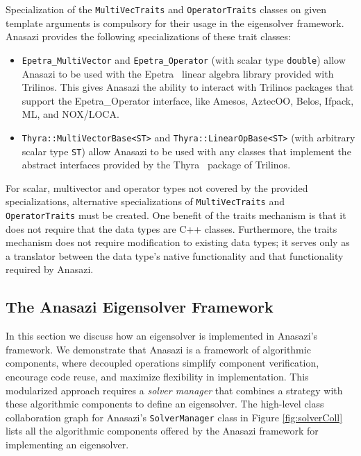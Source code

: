 \documentclass[acmtoms]{acmtrans2m}
\newcounter{algorithm}
\newcommand{\aspace}[1]{\texttt{#1}}
\begin{document}
Specialization of the \aspace{MultiVecTraits} and \aspace{OperatorTraits} classes on
given template arguments is compulsory for their usage in the eigensolver framework.
Anasazi provides the following specializations of these trait classes:
\begin{itemize}
  \item \aspace{Epetra\_MultiVector} and \aspace{Epetra\_Operator} (with scalar type
    \aspace{double}) allow Anasazi to be used with the Epetra~\cite{Trilinos:Epetra} linear
    algebra library provided with Trilinos. This gives Anasazi the ability to interact with 
    Trilinos packages that support the Epetra\_Operator interface, like Amesos, AztecOO, Belos, 
    Ifpack, ML, and NOX/LOCA. 
  \item \aspace{Thyra::MultiVectorBase<ST>} and
    \aspace{Thyra::LinearOpBase<ST>} (with arbitrary scalar type
    \aspace{ST}) allow Anasazi to be used with any classes that implement the abstract interfaces
    provided by the Thyra~\cite{Trilinos:Thyra} package of Trilinos.
\end{itemize}
For scalar, multivector and operator types not covered by the provided specializations,
alternative specializations of \aspace{MultiVecTraits} and \aspace{OperatorTraits}
must be created. One benefit of the traits mechanism is that it does
not require that the data types are C++ classes.  Furthermore, the traits mechanism
does not require modification to existing data types; it serves only as a translator between
the data type's native functionality and that functionality required by Anasazi.


\subsection{The Anasazi Eigensolver Framework}
\label{subsec:anasazi:solver_framework}

In this section we discuss how an eigensolver is implemented 
in Anasazi's framework.  We demonstrate that Anasazi is 
a framework of algorithmic components, where decoupled operations 
simplify component verification, encourage code reuse, and maximize flexibility
in implementation. This modularized approach requires a \emph{solver manager} that
combines a strategy with these algorithmic components to define an eigensolver.
The high-level class collaboration graph for Anasazi's \aspace{SolverManager} class in 
Figure \ref{fig:solverColl} lists all the algorithmic components offered by the Anasazi
framework for implementing an eigensolver.
\end{document}
